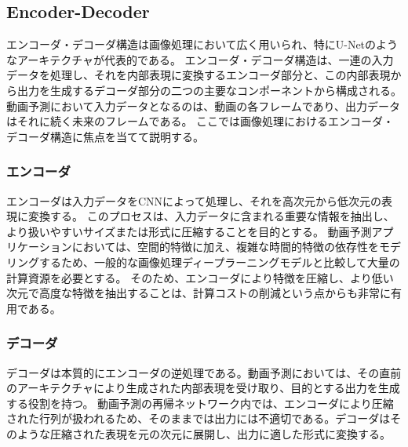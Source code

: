     \subsection{Encoder-Decoder}
      エンコーダ・デコーダ構造は画像処理において広く用いられ、特にU-Netのようなアーキテクチャが代表的である。
      エンコーダ・デコーダ構造は、一連の入力データを処理し、それを内部表現に変換するエンコーダ部分と、この内部表現から出力を生成するデコーダ部分の二つの主要なコンポーネントから構成される。
      動画予測において入力データとなるのは、動画の各フレームであり、出力データはそれに続く未来のフレームである。
      ここでは画像処理におけるエンコーダ・デコーダ構造に焦点を当てて説明する。
        
      \subsubsection{エンコーダ}
        エンコーダは入力データをCNNによって処理し、それを高次元から低次元の表現に変換する。
        このプロセスは、入力データに含まれる重要な情報を抽出し、より扱いやすいサイズまたは形式に圧縮することを目的とする。
        動画予測アプリケーションにおいては、空間的特徴に加え、複雑な時間的特徴の依存性をモデリングするため、一般的な画像処理ディープラーニングモデルと比較して大量の計算資源を必要とする。
        そのため、エンコーダにより特徴を圧縮し、より低い次元で高度な特徴を抽出することは、計算コストの削減という点からも非常に有用である。
        
      \subsubsection{デコーダ}
        デコーダは本質的にエンコーダの逆処理である。動画予測においては、その直前のアーキテクチャにより生成された内部表現を受け取り、目的とする出力を生成する役割を持つ。
        動画予測の再帰ネットワーク内では、エンコーダにより圧縮された行列が扱われるため、そのままでは出力には不適切である。デコーダはそのような圧縮された表現を元の次元に展開し、出力に適した形式に変換する。

    

